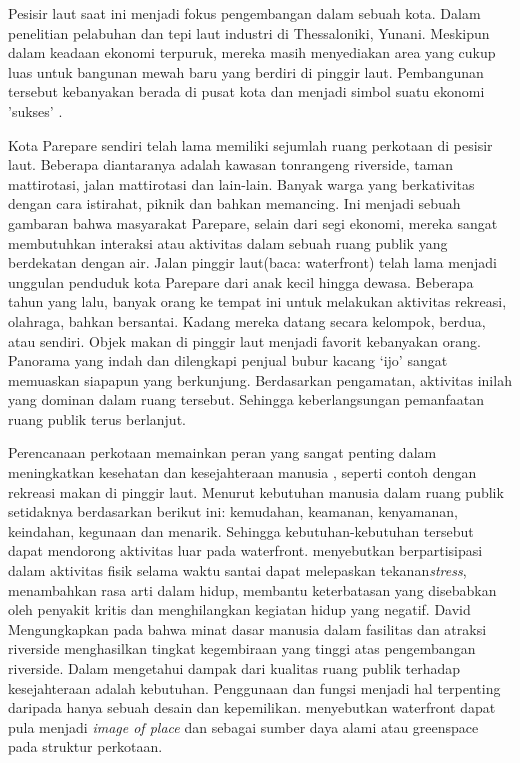 \documentclass[../projects/thesis.tex]{subfiles}
\begin{document}
Pesisir laut saat ini menjadi fokus pengembangan dalam sebuah kota. Dalam penelitian pelabuhan dan tepi laut industri di Thessaloniki, Yunani. Meskipun dalam keadaan ekonomi terpuruk, mereka masih menyediakan area yang cukup luas untuk bangunan mewah baru yang berdiri di pinggir laut. Pembangunan tersebut kebanyakan berada di pusat kota dan menjadi simbol suatu ekonomi 'sukses' \citep{vayona2011}.

Kota Parepare sendiri telah lama memiliki sejumlah ruang perkotaan di pesisir laut. Beberapa diantaranya adalah kawasan tonrangeng riverside, taman mattirotasi, jalan mattirotasi dan lain-lain. Banyak warga yang berkativitas dengan cara istirahat, piknik dan bahkan memancing. Ini menjadi sebuah gambaran bahwa masyarakat Parepare, selain dari segi ekonomi, mereka sangat membutuhkan interaksi atau aktivitas dalam sebuah ruang publik yang berdekatan dengan air.
Jalan pinggir laut(baca: waterfront) telah lama menjadi unggulan penduduk kota Parepare dari anak kecil hingga dewasa. Beberapa tahun yang lalu, banyak orang ke tempat ini untuk melakukan aktivitas rekreasi, olahraga, bahkan bersantai. Kadang mereka datang secara kelompok, berdua, atau sendiri.
Objek makan di pinggir laut menjadi favorit kebanyakan orang. Panorama yang indah dan dilengkapi penjual bubur kacang `ijo' sangat memuaskan siapapun yang berkunjung. Berdasarkan pengamatan, aktivitas inilah yang dominan dalam ruang tersebut. Sehingga keberlangsungan pemanfaatan ruang publik terus berlanjut.

Perencanaan perkotaan memainkan peran yang sangat penting dalam meningkatkan kesehatan dan kesejahteraan manusia \citep{sarkar2017urban}, seperti contoh dengan rekreasi makan di pinggir laut. Menurut \cite{eckstutassociates1986} kebutuhan manusia dalam ruang publik setidaknya berdasarkan berikut ini: kemudahan, keamanan, kenyamanan, keindahan, kegunaan dan menarik. Sehingga kebutuhan-kebutuhan tersebut dapat mendorong aktivitas luar pada waterfront.
\cite{vancauwenberg2018} menyebutkan berpartisipasi dalam aktivitas fisik selama waktu santai dapat melepaskan tekanan\textit{stress}, menambahkan rasa arti dalam hidup, membantu keterbatasan yang disebabkan oleh penyakit kritis dan menghilangkan kegiatan hidup yang negatif. David Mengungkapkan pada \citep{richarda.lehmann1966} bahwa minat dasar manusia dalam fasilitas dan atraksi riverside  menghasilkan tingkat kegembiraan yang tinggi atas pengembangan riverside.
Dalam \citep{adams2013} mengetahui dampak dari kualitas ruang publik terhadap kesejahteraan adalah kebutuhan. Penggunaan dan fungsi menjadi hal terpenting daripada hanya sebuah desain dan kepemilikan. \cite{sairinen2006} menyebutkan waterfront dapat pula menjadi \textit{image of place} dan sebagai sumber daya alami atau greenspace pada struktur perkotaan.
\end{document}
